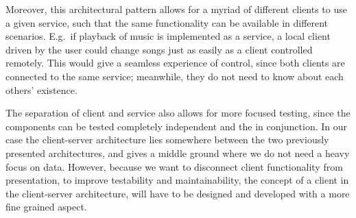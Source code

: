 Moreover, this architectural pattern allows for a myriad of different clients to use a given service, such that the same functionality can be available in different scenarios.
E.g.~if playback of music is implemented as a service, a local client driven by the user could change songs just as easily as a client controlled remotely.
This would give a seamless experience of control, since both clients are connected to the same service; meanwhile, they do not need to know about each others' existence.

The separation of client and service also allows for more focused testing, since the components can be tested completely independent and the in conjunction.
In our case the client-server architecture lies somewhere between the two previously presented architectures, and gives a middle ground where we do not need a heavy focus on data.
However, because we want to disconnect client functionality from presentation, to improve testability and maintainability, the concept of a client in the client-server architecture, will have to be designed and developed with a more fine grained aspect.

